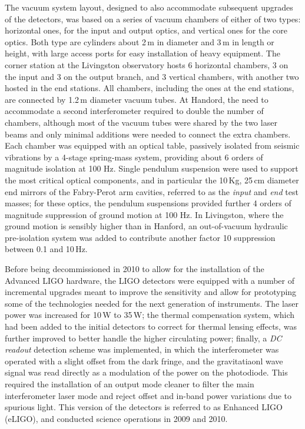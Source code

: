 The vacuum system layout, designed to also accommodate subsequent upgrades of the detectors, was based on a series of vacuum chambers of either of two types: horizontal ones, for the input and output optics, and vertical ones for the core optics.
Both type are cylinders about 2\,m in diameter and 3\,m in length or height, with large access ports for easy installation of heavy equipment.
The corner station at the Livingston observatory hosts 6 horizontal chambers, 3 on the input and 3  on the output branch, and 3 vertical chambers, with another two hosted in the end stations.
All chambers, including the ones at the end stations, are connected by 1.2\,m diameter vacuum tubes.
At Handord, the need to accommodate a second interferometer required to double the number of chambers, although most of the vacuum tubes were shared by the two laser beams and only minimal additions were needed to connect the extra chambers.
Each chamber was equipped with an optical table, passively isolated from seismic vibrations by a 4-stage spring-mass system, providing about 6 orders of magnitude isolation at 100 Hz\cite{Giaime_1996}.
Single pendulum suspension were used to support the most critical optical components, and in particular the 10\,Kg, 25\,cm diameter end mirrors of the Fabry-Perot arm cavities, referred to as the \textit{input} and \textit{end} test masses; for these optics, the pendulum suspensions provided further 4 orders of magnitude suppression of ground motion at 100 Hz.
In Livingston, where the ground motion is sensibly higher than in Hanford, an out-of-vacuum hydraulic pre-isolation system\cite{Wen_2014} was added to contribute another factor 10 suppression between 0.1 and 10\,Hz.

Before being decommissioned in 2010 to allow for the installation of the Advanced LIGO hardware, the LIGO detectors were equipped with a number of incremental upgrades\cite{Aasi_2015} meant to improve the sensitivity and allow for prototyping some of the technologies needed for the next generation of instruments.
The laser power was increased for 10\,W to 35\,W;
the thermal compensation system, which had been added to the initial detectors to correct for thermal lensing effects, was further improved to better handle the higher circulating power;
finally, a \textit{DC readout} detection scheme was implemented, in which the interferometer was operated with a slight offset from the dark fringe, and the gravitatiaonl wave signal was read directly as a modulation of the power on the photodiode.
This required the installation of an output mode cleaner to filter the main interferometer laser mode and reject offset and in-band power variations due to spurious light.
This version of the detectors is referred to as Enhanced LIGO (eLIGO), and conducted science operations in 2009 and 2010. 

